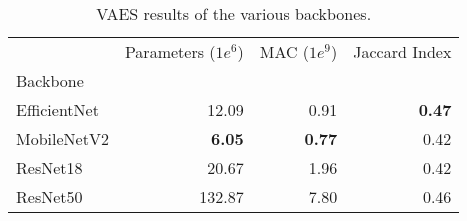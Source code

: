 \begin{table}[ht]
\centering
\caption{VAES results of the various backbones.}
\label{tab:vaes-backbones-results}
\begin{tabular}{lrrr}
\toprule
 & Parameters ($1e^6$) & MAC ($1e^9$) & Jaccard Index \\
Backbone &  &  &  \\
\midrule
EfficientNet & 12.09 & 0.91 & \textbf{0.47} \\
MobileNetV2 & \textbf{6.05} & \textbf{0.77} & 0.42 \\
ResNet18 & 20.67 & 1.96 & 0.42 \\
ResNet50 & 132.87 & 7.80 & 0.46 \\
\bottomrule
\end{tabular}
\end{table}
